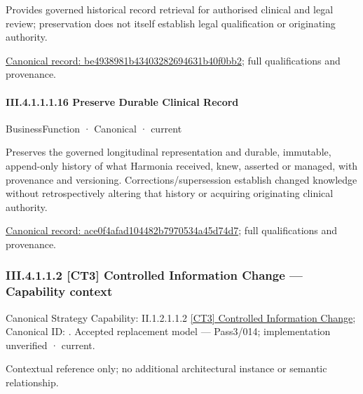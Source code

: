 Provides governed historical record retrieval for authorised clinical and legal review; preservation does not itself establish legal qualification or originating authority.


{\footnotesize \href{../../../../../../../../continuum/business/business-service/be4938981b43403282694631b40f0bb2.md}{Canonical record: be4938981b43403282694631b40f0bb2}; full qualifications and provenance.}\par
\paragraph*{III.4.1.1.1.16 Preserve Durable Clinical Record}
\label{navigation:III.4.1.1.1.16}

\label{element:ace0f4afad104482b7970534a45d74d7}
{\small BusinessFunction · Canonical · current}\par

Preserves the governed longitudinal representation and durable, immutable, append-only history of what Harmonia received, knew, asserted or managed, with provenance and versioning. Corrections/supersession establish changed knowledge without retrospectively altering that history or acquiring originating clinical authority.


{\footnotesize \href{../../../../../../../../continuum/business/business-function/ace0f4afad104482b7970534a45d74d7.md}{Canonical record: ace0f4afad104482b7970534a45d74d7}; full qualifications and provenance.}\par
\subsubsection*{III.4.1.1.2 [CT3] Controlled Information Change — Capability context}
\label{navigation:III.4.1.1.2}

{\small Canonical Strategy Capability: II.1.2.1.1.2 \hyperref[element:2eed03f280434e369d7118b63259c02d]{[CT3] Controlled Information Change}; Canonical ID: \texttt{}. Accepted replacement model — Pass3/014; implementation unverified · current.}\par
Contextual reference only; no additional architectural instance or semantic relationship.\par
